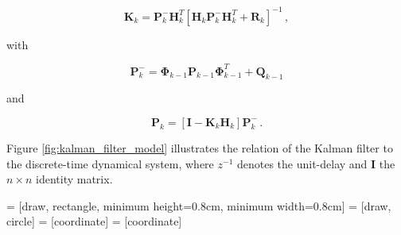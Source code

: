 \begin{equation}\label{eq:Kalman_gain}
  \mathbf{K}_{k} = \mathbf{P}^-_k \mathbf{H}^T_k[\mathbf{H}_k \mathbf{P}^-_k \mathbf{H}^T_k + \mathbf{R}_k]^{-1}\,,
\end{equation}

\noindent
with

\begin{equation}\label{eq:apriori_error_cov}
  \mathbf{P}^-_{k} = \mathbf{\Phi}_{k-1} \mathbf{P}_{k-1} \mathbf{\Phi}^T_{k-1} + \mathbf{Q}_{k-1}
\end{equation}

\noindent
and

\begin{equation}\label{eq:aposteriori_error_cov}
  \mathbf{P}_{k} = [\mathbf{I} - \mathbf{K}_{k}\mathbf{H}_{k}]\mathbf{P}^-_{k}\,.
\end{equation}

\noindent
Figure \ref{fig:kalman_filter_model} illustrates the relation of the Kalman filter to the discrete-time dynamical system, where $z^{-1}$ denotes the unit-delay and $\mathbf{I}$ the $n\times n$ identity matrix. 

 = [draw, rectangle, minimum height=0.8cm, minimum width=0.8cm]
 = [draw, circle]
 = [coordinate]
 = [coordinate]

